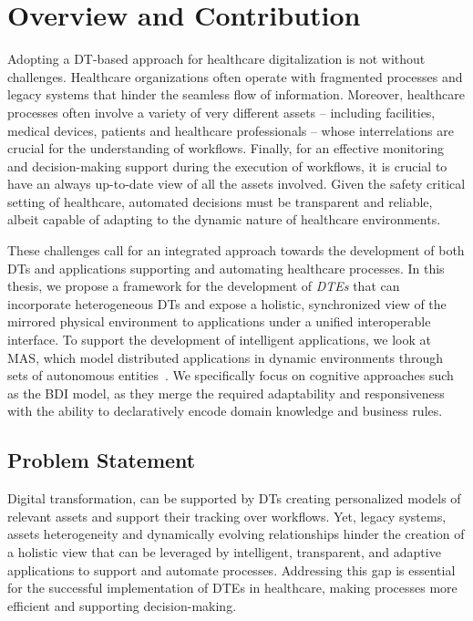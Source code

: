 \section*{Overview and Contribution}

Adopting a \ac{DT}-based approach for healthcare digitalization is not without challenges.
%
Healthcare organizations often operate with fragmented processes and legacy systems that hinder the seamless flow of information.
%
Moreover, healthcare processes often involve a variety of very different assets
-- including facilities, medical devices, patients and healthcare professionals --
whose interrelations are crucial for the understanding of workflows.
%
Finally, for an effective monitoring and decision-making support during the execution of workflows, it is crucial to have an always up-to-date view of all the assets involved.
%
Given the safety critical setting of healthcare, automated decisions must be transparent and reliable, albeit capable of adapting to the dynamic nature of healthcare environments.


These challenges call for an integrated approach towards the development of both \acp{DT} and applications supporting and automating healthcare processes.
%
In this thesis, we propose a framework for the development of \emph{\acp{DTE}} that can incorporate heterogeneous \acp{DT} and expose a holistic, synchronized view of the mirrored physical environment to applications under a unified interoperable interface.
%
To support the development of intelligent applications, we look at \ac{MAS}, which model distributed applications in dynamic environments through sets of autonomous entities~\missingref{}.
We specifically focus on cognitive approaches such as the \ac{BDI} model, as they merge the required adaptability and responsiveness with the ability to declaratively encode domain knowledge and business rules.

\subsection*{Problem Statement}
Digital transformation, can be supported by \aclp{DT} creating personalized models of relevant assets and support their tracking over workflows.
Yet, legacy systems, assets heterogeneity and dynamically evolving relationships hinder the creation of a holistic view that can be leveraged by intelligent, transparent, and adaptive applications to support and automate processes.
Addressing this gap is essential for the successful implementation of \aclp{DTE} in healthcare, making processes more efficient and supporting decision-making.

